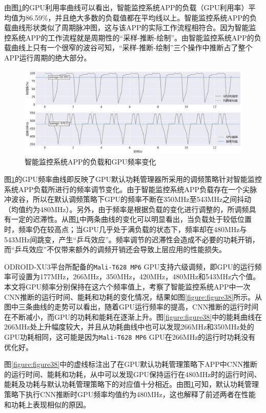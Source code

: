由图\ref{figure:figure37}的GPU利用率曲线可以看出，智能监控系统APP的负载（GPU利用率）平均值为86.59\%，并且绝大多数的负载值都在平均线以上。智能监控系统APP的负载曲线形状类似了周期脉冲图，这与该APP的实际工作流程相符合。因为智能监控系统APP的工作流程就是周期性的“采样-推断-绘制”。由智能监控系统APP的负载曲线上只有一个很窄的波谷可知，“采样-推断-绘制”三个操作中推断占了整个APP运行周期的绝大部分。

\begin{figure}[htbp]
    \centering
    \includegraphics[width=1.0\textwidth]{figures/system_util.pdf}
    \caption{智能监控系统APP的负载和GPU频率变化}\label{figure:figure37}
\end{figure}

图\ref{figure:figure37}的GPU频率曲线即反映了GPU默认功耗管理器所采用的调频策略针对智能监控系统APP负载所进行的频率调节变化。由于智能监控系统APP负载存在一个尖脉冲波谷，所以在默认调频策略下GPU的频率不断在350MHz至543MHz之间抖动（均值约为480MHz）。另外，由于频率是根据负载的变化进行调整的，所调频具有一定的迟滞性。从图\ref{figure:figure37}中两条曲线的变化可以明显看出，当负载处于较低位置时，频率仍在较高点；当GPU几乎处于满负载的状态下，频率却在480MHz与543MHz间跳变，产生“乒乓效应”。频率调节的迟滞性会造成不必要的功耗开销，而“乒乓效应”不仅带来额外的调频开销还会导致上层应用的性能损失。

ODROID-XU3平台所配备的\texttt{Mali-T628 MP6} GPU支持六级调频，即GPU的运行频率可设置为177MHz，266MHz，350MHz，420MHz，480MHz和543MHz六个值。本文将GPU频率分别保持在这六个频率值上，考察了智能监控系统APP中一次CNN推断的运行时间、能耗和功耗的变化情况，结果如图\ref{figure:figure38}所示。从图中三条曲线的走势可以看出，随着GPU运行频率的提高，CNN推断的运行时间在不断减小，而GPU的功耗和能耗在逐渐上升。图\ref{figure:figure38}中的能耗曲线在266MHz处上升幅度较大，并且从功耗曲线中也可以发现266MHz和350MHz处的GPU功耗相同，这可能是因为\texttt{Mali-T628 MP6} GPU在266MHz的运行时功耗没有优化好。

图\ref{figure:figure38}中的虚线标注出了在GPU默认功耗管理策略下APP中CNN推断的运行时间、能耗和功耗，从中可以发现GPU保持运行在480MHz时的运行时间、能耗及功耗与默认功耗管理策略下的对应值十分相近。由图\ref{figure:figure37}可知，默认功耗管理策略下执行CNN推断时GPU频率均值约为480MHz，这也解释了前述两者在性能和功耗上表现相似的原因。

